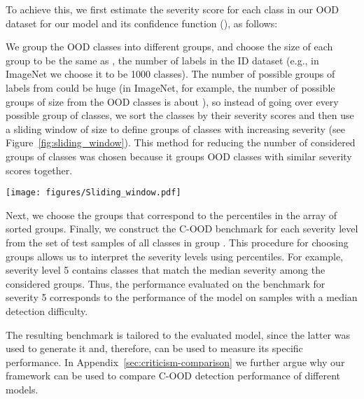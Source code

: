 \documentclass[table]{article} \usepackage{PRIMEarxiv}
\begin{document}
To achieve this, we first estimate the severity score for each class  in our OOD dataset for our model and its confidence function (), as follows:

We group the OOD classes into different groups, and choose the size of each group 
to be the same as , the number of labels in the ID dataset (e.g., in ImageNet we choose it to be 1000 classes). The number of possible groups of labels from  could be huge (in ImageNet, for example, the number of possible groups of size  from the  OOD classes is about ), so instead of going over every possible group of classes, we sort the classes by their severity scores and then use a sliding window of size  to define  groups of classes with increasing severity (see Figure~\ref{fig:sliding_window}). 
This method for reducing the number of considered groups of classes was chosen because it groups OOD classes with similar severity scores together.
\begin{figure*}[h]
    \centering
    \texttt{[image: figures/Sliding\_window.pdf]}
    \caption{We define  groups of classes with increasing severity by sorting all OOD classes  by their severity scores , and then use a sliding window of size  to choose the considered groups.}
    \label{fig:sliding_window}
\end{figure*}

Next, we choose the groups that correspond to the percentiles  in the array of sorted groups.
Finally, we construct the C-OOD benchmark for each severity level  from the set of test samples  of all classes in group . 
This procedure for choosing groups allows us to interpret the severity levels using percentiles. 
For example, severity level 5 contains classes that match the median severity among the considered groups. Thus, the performance evaluated on the benchmark for 
severity 5 corresponds to the performance of the model on samples with a median detection difficulty.

The resulting benchmark is tailored to the evaluated model, since the latter was used to generate it and, therefore, can be used to measure its specific performance. In Appendix~\ref{sec:criticism-comparison} we further argue why our framework can be used to compare C-OOD detection performance of different models.
\end{document}

